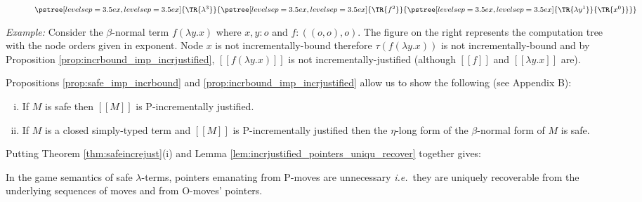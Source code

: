 \documentclass{llncs}
\newcommand{\sem}[1]{{[\![ #1 ]\!]}}
\newcommand{\tree}[2][levelsep=3.5ex]{\pstree[levelsep=3.5ex,#1]{\TR{#2}}}
\begin{document}
\begin{wrapfigure}[5]{r}{0.6cm}
$
{\tree{\lambda^3}{\tree{f^2}{ \tree{\lambda y^1}{ \TR{x^0} }}}}$
\end{wrapfigure}
\noindent \emph{Example:} %
Consider the $\beta$-normal term $f (\lambda y .x)$ where $x,y:o$ and
$f:((o,o),o)$. The figure on the right represents the computation tree
with the node orders given in exponent.  Node $x$ is not
incrementally-bound therefore $\tau(f (\lambda y .x))$ is not
incrementally-bound and by Proposition
\ref{prop:incrbound_imp_incrjustified}, $\sem{f (\lambda y .x)}$ is
not incrementally-justified (although $\sem{f}$ and $\sem{\lambda
  y. x}$ are).

Propositions \ref{prop:safe_imp_incrbound} and
\ref{prop:incrbound_imp_incrjustified} allow us to show the following
(see Appendix B):

\begin{theorem}
\label{thm:safeincrejust}
\begin{enumerate}[(i)]
\item If $M$ is safe then $\sem{M}$ is P-incrementally justified.
\item If $M$ is a closed simply-typed term and $\sem{M}$ is
  P-incrementally justified then the $\eta$-long form of the
  $\beta$-normal form of $M$ is safe.
\end{enumerate}
\end{theorem}

Putting Theorem \ref{thm:safeincrejust}(i) and Lemma
\ref{lem:incrjustified_pointers_uniqu_recover} together gives:
\begin{proposition}
  \label{prop:safe_ptr_recoverable} In the game semantics of safe
  $\lambda$-terms, pointers emanating from P-moves are unnecessary
  {\it i.e.}~they are uniquely recoverable from the underlying sequences of
  moves and from O-moves' pointers.
\end{proposition}

\end{document}
